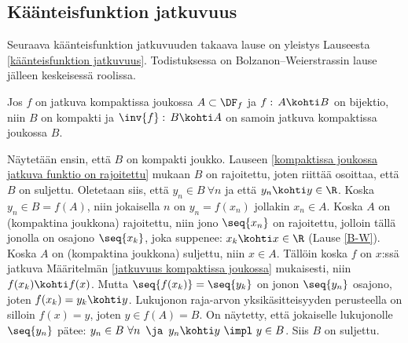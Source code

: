 \subsection{Käänteisfunktion jatkuvuus}

Seuraava käänteisfunktion jatkuvuuden takaava lause on yleistys Lauseesta 
\ref{käänteisfunktion jatkuvuus}. Todistuksessa on Bolzanon--Weierstrassin lause jälleen
keskeisessä roolissa.
\begin{*Lause} \label{R:n käänteisfunktiolause} Jos $f$ on jatkuva kompaktissa joukossa
$A\subset\DF_f$ ja $f:\,A \kohti B$ on bijektio, niin $B$ on kompakti ja
$\inv{f}:\,B \kohti A$ on samoin jatkuva kompaktissa joukossa $B$.
\end{*Lause}
\tod  Näytetään ensin, että $B$ on kompakti joukko. Lauseen
\ref{kompaktissa joukossa jatkuva funktio on rajoitettu} mukaan $B$ on rajoitettu, joten 
riittää osoittaa, että $B$ on suljettu. Oletetaan siis, että $y_n \in B\ \forall n$ ja 
että $y_n \kohti y\in\R$. Koska $y_n \in B=f(A)$, niin jokaisella $n$ on $y_n=f(x_n)$ jollakin
$x_n \in A$. Koska $A$ on (kompaktina joukkona) rajoitettu, niin jono $\seq{x_n}$ on
rajoitettu, jolloin tällä jonolla on osajono $\seq{x_k}$, joka suppenee: $x_k \kohti x\in\R$
(Lause \ref{B-W}). Koska $A$ on (kompaktina joukkona) suljettu, niin $x \in A$. Tällöin koska
$f$ on $x$:ssä jatkuva Määritelmän \ref{jatkuvuus kompaktissa joukossa} mukaisesti, niin
 $f(x_k) \kohti f(x)$. Mutta $\seq{f(x_k)}=\seq{y_k}$ on jonon $\seq{y_n}$ osajono, joten
$f(x_k)=y_k \kohti y$. Lukujonon raja-arvon yksikäsitteisyyden perusteella on silloin
$f(x)=y$, joten $y \in f(A)=B$. On näytetty, että jokaiselle lukujonolle $\seq{y_n}$ pätee: 
$y_n \in B\ \forall n\,\ \ja\,\ y_n \kohti y\ \impl\ y \in B$. Siis $B$ on suljettu.

